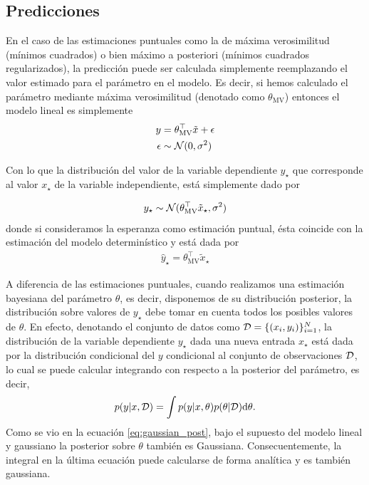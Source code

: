 \subsection{Predicciones} %
\label{sub:predicciones}
En el caso de las estimaciones puntuales como la de máxima verosimilitud (mínimos cuadrados) o bien máximo a posteriori (mínimos cuadrados regularizados), la predicción puede ser calculada simplemente reemplazando el valor estimado para el parámetro en el modelo. Es decir, si hemos calculado el parámetro mediante máxima verosimilitud (denotado como $\theta_{\text{MV}}$) entonces el modelo lineal es simplemente 
\begin{align}
	 y &= \theta_{\text{MV}}^\top \tilde{x} + \epsilon\\
	 \epsilon &\sim {\mathcal N}(0,\sigma^2)
\end{align}

Con lo que la distribución del valor de la variable dependiente $y_\star$ que corresponde al valor $x_\star$ de la variable independiente, está simplemente dado por 

\begin{align}
	 y_\star \sim  {\mathcal N}(\theta_{\text{MV}}^\top \tilde{x}_\star,\sigma^2) 
\end{align}
donde si consideramos la esperanza como estimación puntual, ésta coincide con la estimación del modelo determinístico y está dada por 
\begin{align}
	 \hat{y}_\star  = \theta_{\text{MV}}^\top \tilde{x}_\star
\end{align}

A diferencia de las estimaciones puntuales, cuando realizamos una estimación bayesiana del parámetro $\theta$, es decir, disponemos de su distribución posterior, la distribución sobre valores de $y_\star$ debe tomar en cuenta todos los posibles valores de $\theta$. En efecto, denotando el conjunto de datos como ${\mathcal D}=\{(x_i,y_i)\}_{i=1}^N$, la distribución de la variable dependiente $y_\star$ dada una nueva entrada $x_\star$ está dada por la distribución condicional del $y$ condicional al conjunto de observaciones ${\mathcal D}$, lo cual se puede calcular integrando con respecto a la posterior del parámetro, es decir, 
\begin{equation}
 	p(y|x,{\mathcal D}) = \int p(y|x, \theta)p(\theta|{\mathcal D}) {\text d}\theta.
 \end{equation} 
Como se vio en la ecuación \eqref{eq:gaussian_post}, bajo el supuesto del modelo lineal y gaussiano la posterior sobre $\theta$ también es Gaussiana. Consecuentemente, la integral en la última ecuación puede calcularse de forma analítica y es también gaussiana. 

